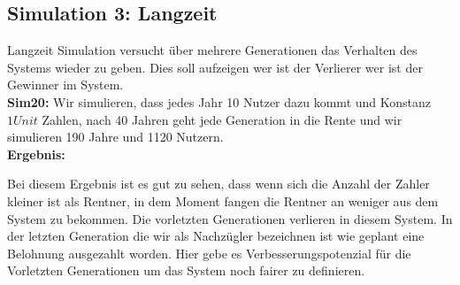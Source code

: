 \subsection{Simulation 3: Langzeit}

Langzeit Simulation versucht über mehrere Generationen das Verhalten des Systems wieder zu geben. Dies soll aufzeigen wer ist der Verlierer wer ist der Gewinner im System. \\

\textbf{Sim20:} Wir simulieren, dass jedes Jahr 10 Nutzer dazu kommt und Konstanz $1 Unit$ Zahlen, nach 40 Jahren geht jede Generation in die Rente und wir simulieren 190 Jahre und 1120 Nutzern. \\

\textbf{Ergebnis:}

\begin{table}[hbt!]
\centering
{}
\end{table}

Bei diesem Ergebnis ist es gut zu sehen, dass wenn sich die Anzahl der Zahler kleiner ist als Rentner, in dem Moment fangen die Rentner an weniger aus dem System zu bekommen. Die vorletzten Generationen verlieren in diesem System. In der letzten Generation die wir als Nachzügler bezeichnen ist wie geplant eine Belohnung ausgezahlt worden. Hier gebe es Verbesserungspotenzial für die Vorletzten Generationen um das System noch fairer zu definieren.

